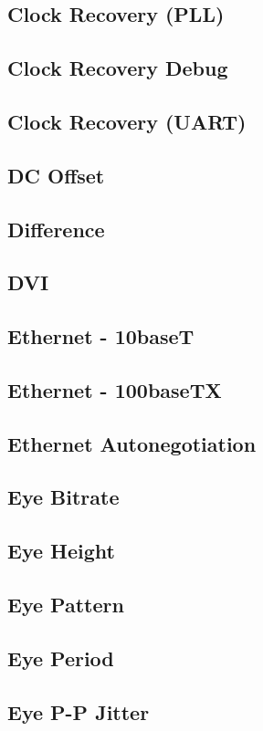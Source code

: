 \documentclass[11pt]{article}
\begin{document}
\subsection{Clock Recovery (PLL)}
\label{filter:cdrpll}

\subsection{Clock Recovery Debug}
\subsection{Clock Recovery (UART)}
\subsection{DC Offset}
\subsection{Difference}
\subsection{DVI}
\label{filter:dvi}

\subsection{Ethernet - 10baseT}
\subsection{Ethernet - 100baseTX}
\subsection{Ethernet Autonegotiation}
\subsection{Eye Bitrate}
\subsection{Eye Height}
\subsection{Eye Pattern}
\subsection{Eye Period}
\subsection{Eye P-P Jitter}
\end{document}
